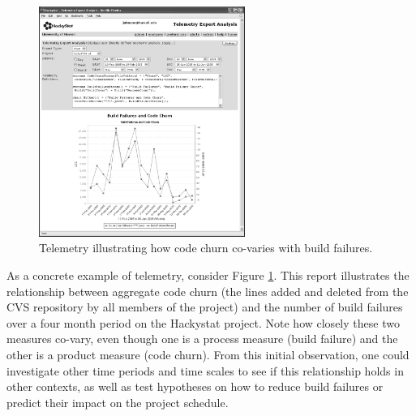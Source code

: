 \begin{figure}[ht]
  \centering
  \includegraphics[width=0.60\textwidth]{BuildAndChurn.eps}
  \caption{Telemetry illustrating how code churn co-varies with build failures.} 
  \label{fig:telemetryreport}
\end{figure}

As a concrete example of telemetry, consider Figure
\ref{fig:telemetryreport}. This report illustrates the relationship between
aggregate code churn (the lines added and deleted from the CVS repository
by all members of the project) and the number of build failures
over a four month period on the Hackystat project. Note how closely these
two measures co-vary, even though one is a process measure (build failure)
and the other is a product measure (code churn).  From this initial
observation, one could investigate other time periods and time scales to
see if this relationship holds in other contexts, as well as test
hypotheses on how to reduce build failures or predict their impact on the
project schedule.

